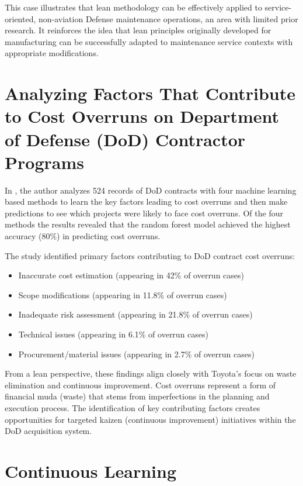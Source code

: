 \documentclass{article}
\begin{document}
			This case illustrates that lean methodology can be effectively applied to service-oriented, non-aviation Defense maintenance operations, an area with limited prior research. 
			It reinforces the idea that lean principles originally developed for manufacturing can be successfully adapted to maintenance service contexts with appropriate modifications.


		\section{Analyzing Factors That Contribute to Cost Overruns on Department of Defense (DoD) Contractor Programs \cite{FunchesAllen2025}}

			In \cite{FunchesAllen2025}, the author analyzes 524 records of DoD contracts with four machine learning based methods to learn the key factors leading to cost overruns and then make predictions to see which projects were likely to face cost overruns.
			Of the four methods the results revealed that the random forest model achieved the highest accuracy (80\%) in predicting cost overruns. 

			The study identified primary factors contributing to DoD contract cost overruns:
			\begin{itemize}
				\item Inaccurate cost estimation (appearing in 42\% of overrun cases)
				\item Scope modifications (appearing in 11.8\% of overrun cases)
				\item Inadequate risk assessment (appearing in 21.8\% of overrun cases)
				\item Technical issues (appearing in 6.1\% of overrun cases)
				\item Procurement/material issues (appearing in 2.7\% of overrun cases)
			\end{itemize}


			From a lean perspective, these findings align closely with Toyota's focus on waste elimination and continuous improvement. 
			Cost overruns represent a form of financial muda (waste) that stems from imperfections in the planning and execution process.
			The identification of key contributing factors creates opportunities for targeted kaizen (continuous improvement) initiatives within the DoD acquisition system.


	\section{Continuous Learning}
\end{document}

